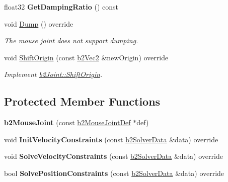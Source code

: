 \begin{DoxyCompactItemize}
\mbox{\label{classb2_mouse_joint_a551de1d56a743e71684a1382054c17c9}} 
float32 {\bfseries Get\+Damping\+Ratio} () const
\item 
\mbox{\label{classb2_mouse_joint_aea1ff1e5b71ba5630875585cab1e2a96}} 
void \hyperlink{classb2_mouse_joint_aea1ff1e5b71ba5630875585cab1e2a96}{Dump} () override
\begin{DoxyCompactList}\small\item\em The mouse joint does not support dumping. \end{DoxyCompactList}\item 
\mbox{\label{classb2_mouse_joint_a9b1b2671837495be175e496afb622904}} 
void \hyperlink{classb2_mouse_joint_a9b1b2671837495be175e496afb622904}{Shift\+Origin} (const \hyperlink{structb2_vec2}{b2\+Vec2} \&new\+Origin) override
\begin{DoxyCompactList}\small\item\em Implement \hyperlink{classb2_joint_a7804f649e993dc0fd9ae47fde5601f90}{b2\+Joint\+::\+Shift\+Origin}. \end{DoxyCompactList}\end{DoxyCompactItemize}
\subsection*{Protected Member Functions}
\begin{DoxyCompactItemize}
\item 
\mbox{\label{classb2_mouse_joint_ad147d7989d884952c3389f7e5e3acf68}} 
{\bfseries b2\+Mouse\+Joint} (const \hyperlink{structb2_mouse_joint_def}{b2\+Mouse\+Joint\+Def} $\ast$def)
\item 
\mbox{\label{classb2_mouse_joint_a02c342a98cfa5687de2bd3dba7c700b1}} 
void {\bfseries Init\+Velocity\+Constraints} (const \hyperlink{structb2_solver_data}{b2\+Solver\+Data} \&data) override
\item 
\mbox{\label{classb2_mouse_joint_a9256297320a1a67e9dc49b70f4798dd8}} 
void {\bfseries Solve\+Velocity\+Constraints} (const \hyperlink{structb2_solver_data}{b2\+Solver\+Data} \&data) override
\item 
\mbox{\label{classb2_mouse_joint_a13f9ec996eff59c15e6330a8c3f5ba9f}} 
bool {\bfseries Solve\+Position\+Constraints} (const \hyperlink{structb2_solver_data}{b2\+Solver\+Data} \&data) override
\end{DoxyCompactItemize}
